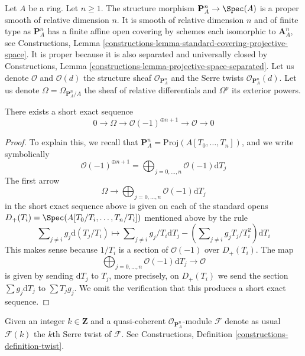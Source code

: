 \noindent
Let $A$ be a ring. Let $n \geq 1$. The structure morphism
$\mathbf{P}^n_A \to \Spec(A)$ is a proper smooth of relative
dimension $n$. It is smooth of relative dimension $n$ and of finite type
as $\mathbf{P}^n_A$ has a finite affine open covering by schemes each
isomorphic to $\mathbf{A}^n_A$, see Constructions, Lemma
\ref{constructions-lemma-standard-covering-projective-space}.
It is proper because it is also separated and universally closed
by Constructions, Lemma \ref{constructions-lemma-projective-space-separated}.
Let us denote $\mathcal{O}$ and $\mathcal{O}(d)$ the structure sheaf
$\mathcal{O}_{\mathbf{P}^n_A}$ and the Serre twists
$\mathcal{O}_{\mathbf{P}^n_A}(d)$.
Let us denote $\Omega = \Omega_{\mathbf{P}^n_A/A}$ the sheaf
of relative differentials and $\Omega^p$ its exterior powers.

\begin{lemma}
\label{lemma-euler-sequence}
There exists a short exact sequence
$$
0 \to \Omega \to \mathcal{O}(-1)^{\oplus n + 1} \to \mathcal{O} \to 0
$$
\end{lemma}

\begin{proof}
To explain this, we recall that
$\mathbf{P}^n_A = \text{Proj}(A[T_0, \ldots, T_n])$,
and we write symbolically
$$
\mathcal{O}(-1)^{\oplus n + 1} =
\bigoplus\nolimits_{j = 0, \ldots, n} \mathcal{O}(-1) \text{d}T_j
$$
The first arrow
$$
\Omega \to
\bigoplus\nolimits_{j = 0, \ldots, n} \mathcal{O}(-1) \text{d}T_j
$$
in the short exact sequence above
is given on each of the standard opens
$D_+(T_i) = \Spec(A[T_0/T_i, \ldots, T_n/T_i])$
mentioned above by the rule
$$
\sum\nolimits_{j \not = i} g_j \text{d}(T_j/T_i)
\longmapsto
\sum\nolimits_{j \not = i} g_j/T_i \text{d}T_j
- (\sum\nolimits_{j \not = i} g_jT_j/T_i^2) \text{d}T_i
$$
This makes sense because $1/T_i$ is a section of $\mathcal{O}(-1)$
over $D_+(T_i)$. The map
$$
\bigoplus\nolimits_{j = 0, \ldots, n} \mathcal{O}(-1) \text{d}T_j
\to
\mathcal{O}
$$
is given by sending $\text{d}T_j$ to $T_j$, more precisely, on
$D_+(T_i)$ we send the section $\sum g_j \text{d}T_j$ to
$\sum T_jg_j$. We omit the verification that this produces
a short exact sequence.
\end{proof}

\noindent
Given an integer $k \in \mathbf{Z}$ and a quasi-coherent
$\mathcal{O}_{\mathbf{P}^n_A}$-module $\mathcal{F}$
denote as usual $\mathcal{F}(k)$ the $k$th Serre twist of $\mathcal{F}$.
See Constructions, Definition \ref{constructions-definition-twist}.

